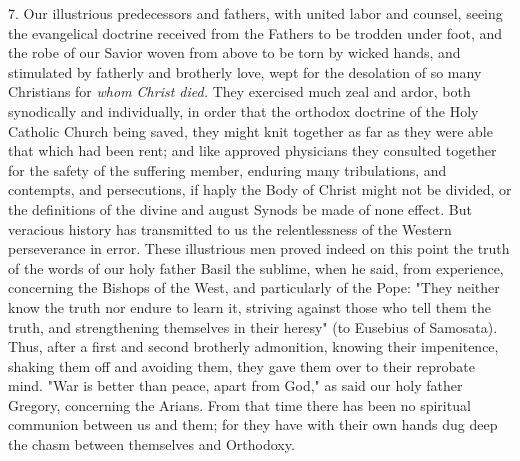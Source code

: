 7. Our illustrious predecessors and fathers, with united labor and
counsel, seeing the evangelical doctrine received from the Fathers to be
trodden under foot, and the robe of our Savior woven from above to be
torn by wicked hands, and stimulated by fatherly and brotherly love,
wept for the desolation of so many Christians for \emph{whom Christ
died.} They exercised much zeal and ardor, both synodically and
individually, in order that the orthodox doctrine of the Holy Catholic
Church being saved, they might knit together as far as they were able
that which had been rent; and like approved physicians they consulted
together for the safety of the suffering member, enduring many
tribulations, and contempts, and persecutions, if haply the Body of
Christ might not be divided, or the definitions of the divine and august
Synods be made of none effect. But veracious history has transmitted to
us the relentlessness of the Western perseverance in error. These
illustrious men proved indeed on this point the truth of the words of
our holy father Basil the sublime, when he said, from experience,
concerning the Bishops of the West, and particularly of the Pope: "They
neither know the truth nor endure to learn it, striving against those
who tell them the truth, and strengthening themselves in their heresy"
(to Eusebius of Samosata). Thus, after a first and second brotherly
admonition, knowing their impenitence, shaking them off and avoiding
them, they gave them over to their reprobate mind. "War is better than
peace, apart from God," as said our holy father Gregory, concerning the
Arians. From that time there has been no spiritual communion between us
and them; for they have with their own hands dug deep the chasm between
themselves and Orthodoxy.

